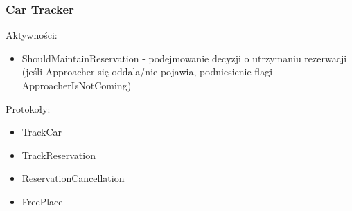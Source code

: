 \newpage
\subsubsection{Car Tracker}

Aktywności:
\begin{itemize}
    \item ShouldMaintainReservation - podejmowanie decyzji o utrzymaniu rezerwacji (jeśli Approacher się oddala/nie pojawia, podniesienie flagi ApproacherIsNotComing)
\end{itemize}

Protokoły:
\begin{itemize}
    \item TrackCar
    \item TrackReservation 
    \item ReservationCancellation
    \item FreePlace 
    
\end{itemize}


